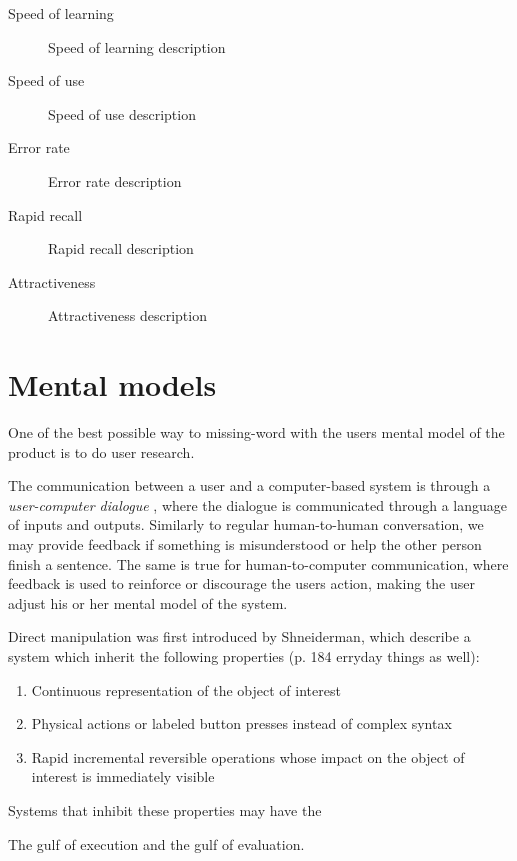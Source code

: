 \begin{description}
  \item [Speed of learning] Speed of learning description
  \item [Speed of use] Speed of use description
  \item [Error rate]  Error rate description
  \item [Rapid recall] Rapid recall description
  \item [Attractiveness] Attractiveness description
\end{description}

\section{Mental models}

One of the best possible way to missing-word with the users mental model of the product is to do user research.

The communication between a user and a computer-based system is through a \textit{user-computer dialogue} \cite{Foley1996}, where the dialogue is communicated through a language of inputs and outputs. Similarly to regular human-to-human conversation, we may provide feedback if something is misunderstood or help the other person finish a sentence. The same is true for human-to-computer communication, where feedback is used to reinforce or discourage the users action, making the user adjust his or her mental model of the system.

Direct manipulation was first introduced by Shneiderman, which describe a system which inherit the following properties (p. 184 erryday things as well):

\begin{enumerate}
  \item Continuous representation of the object of interest
  \item Physical actions or labeled button presses instead of complex syntax
  \item Rapid incremental reversible operations whose impact on the object of interest is immediately visible
\end{enumerate}

Systems that inhibit these properties may have the

The gulf of execution and the gulf of evaluation.

